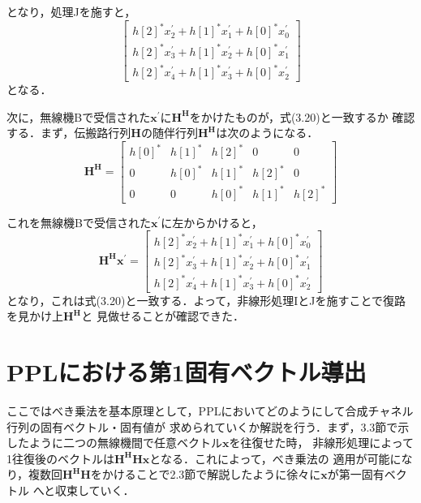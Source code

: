 となり，処理Jを施すと，
\begin{equation}
    \left[
        \begin{array}{c}
            h[2]^*x_2^{\prime}+h[1]^*x_1^{\prime}+h[0]^*x_0^{\prime} \\
            h[2]^*x_3^{\prime}+h[1]^*x_2^{\prime}+h[0]^*x_1^{\prime} \\
            h[2]^*x_4^{\prime}+h[1]^*x_3^{\prime}+h[0]^*x_2^{\prime}
        \end{array}
    \right]
\end{equation}
となる．

次に，無線機Bで受信された$\bm{x^{\prime}}$に$\bm{H^H}$をかけたものが，式(3.20)と一致するか
確認する．まず，伝搬路行列$\bm{H}$の随伴行列$\bm{H^H}$は次のようになる．
\begin{equation}
    \bm{H^H} = \left[
        \begin{array}{ccccc}
            h[0]^* & h[1]^* & h[2]^* & 0 & 0 \\
            0 & h[0]^* & h[1]^* & h[2]^* & 0 \\
            0 & 0 & h[0]^* & h[1]^* & h[2]^*
        \end{array}
    \right]
\end{equation}

これを無線機Bで受信された$\bm{x^{\prime}}$に左からかけると，
\begin{equation}
    \bm{H^Hx^{\prime}} = \left[
        \begin{array}{c}
            h[2]^*x_2^{\prime}+h[1]^*x_1^{\prime}+h[0]^*x_0^{\prime} \\
            h[2]^*x_3^{\prime}+h[1]^*x_2^{\prime}+h[0]^*x_1^{\prime} \\
            h[2]^*x_4^{\prime}+h[1]^*x_3^{\prime}+h[0]^*x_2^{\prime}
        \end{array}
    \right]
\end{equation}
となり，これは式(3.20)と一致する．よって，非線形処理IとJを施すことで復路を見かけ上$\bm{H^H}$と
見做せることが確認できた．

\section{PPLにおける第1固有ベクトル導出}
ここではべき乗法を基本原理として，PPLにおいてどのようにして合成チャネル行列の固有ベクトル・固有値が
求められていくか解説を行う．まず，3.3節で示したように二つの無線機間で任意ベクトル$\bm{x}$を往復せた時，
非線形処理によって1往復後のベクトルは$\bm{H^HHx}$となる．これによって，べき乗法の
適用が可能になり，複数回$\bm{H^HH}$をかけることで2.3節で解説したように徐々に$\bm{x}$が第一固有ベクトル
へと収束していく．

